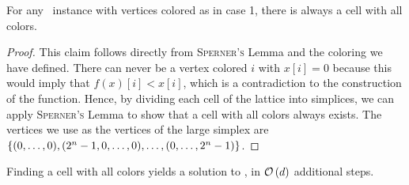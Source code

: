 \begin{lemma}\label{lem:sperner_cell_exists}
	For any \Tarskistar\ instance with vertices colored as in case 1, there is always a cell with all colors.
\end{lemma}
\begin{proof}
	This claim follows directly from \textsc{Sperner's} Lemma and the coloring we have defined. There can never be a vertex colored $i$ with $x[i] = 0$ because this would imply that $f(x)[i] < x[i]$, which is a contradiction to the construction of the function. Hence, by dividing each cell of the lattice into simplices, we can apply \textsc{Sperner's} Lemma to show that a cell with all colors always exists. The vertices we use as the vertices of the large simplex are $\left\{(0, \dots, 0), (2^n - 1, 0, \dots, 0), \dots, (0, \dots, 2^n - 1)\right\}$.
\end{proof}
\begin{lemma}\label{lem:sperner_cell_solution}
	Finding a cell with all colors yields a solution to \Tarskistar, in $\mathcal{O}\left(d\right)$ additional steps.
\end{lemma}
